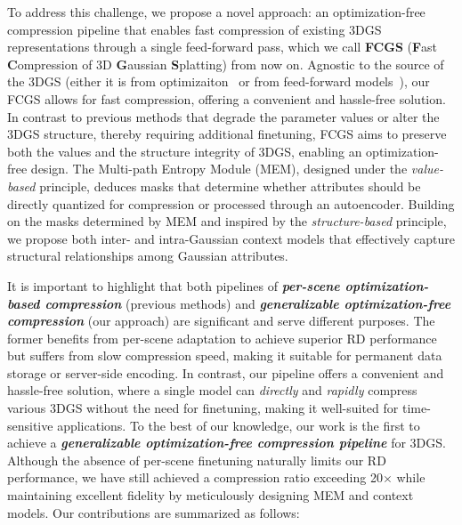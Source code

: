 \documentclass{article} %
\begin{document}
To address this challenge, we propose a novel approach: an optimization-free compression pipeline that enables fast compression of existing 3DGS representations through a single feed-forward pass, which we call \textbf{FCGS} (\textbf{F}ast \textbf{C}ompression of 3D \textbf{G}aussian \textbf{S}platting) from now on. Agnostic to the source of the 3DGS (either it is from optimizaiton~\citep{3DGS} or from feed-forward models~\citep{pixelsplat, splatterimage, MVSplat, LGM}), our FCGS allows for fast compression, offering a convenient and hassle-free solution. 
In contrast to previous methods that degrade the parameter values or alter the 3DGS structure, thereby requiring additional finetuning, FCGS aims to preserve both the values and the structure integrity of 3DGS, enabling an optimization-free design. The Multi-path Entropy Module (MEM), designed under the \emph{value-based} principle, deduces masks that determine whether attributes should be directly quantized for compression or processed through an autoencoder. 
Building on the masks determined by MEM and inspired by the \emph{structure-based} principle, we propose both inter- and intra-Gaussian context models that effectively capture structural relationships among Gaussian attributes.

It is important to highlight that both pipelines of \textbf{\emph{per-scene optimization-based compression}} (previous methods) and \textbf{\emph{generalizable optimization-free compression}} (our approach) are significant and serve different purposes. The former benefits from per-scene adaptation to achieve superior RD performance but suffers from slow compression speed, making it suitable for permanent data storage or server-side encoding. 
In contrast, our pipeline offers a convenient and hassle-free solution, where a single model can \emph{directly} and \emph{rapidly} compress various 3DGS without the need for finetuning, making it well-suited for time-sensitive applications. To the best of our knowledge, our work is the first to achieve a \textbf{\emph{generalizable optimization-free compression pipeline}} for 3DGS.
Although the absence of per-scene finetuning naturally limits our RD performance, we have still achieved a compression ratio exceeding 20$\times$ while maintaining excellent fidelity by meticulously designing MEM and context models. 
Our contributions are summarized as follows:
\end{document}
